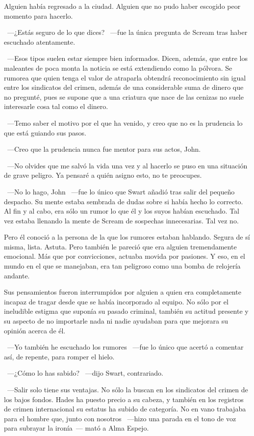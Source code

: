 Alguien había regresado a la ciudad. Alguien que no pudo haber escogido peor momento para hacerlo.

~---¿Estás seguro de lo que dices? ~---fue la única pregunta de Scream tras haber escuchado atentamente.

~---Esos tipos suelen estar siempre bien informados. Dicen, además, que entre los maleantes de poca monta la noticia se está extendiendo como la pólvora. Se rumorea que quien tenga el valor de atraparla obtendrá reconocimiento sin igual entre los sindicatos del crimen, además de una considerable suma de dinero que no pregunté, pues se supone que a una criatura que nace de las cenizas no suele interesarle cosa tal como el dinero.

~---Temo saber el motivo por el que ha venido, y creo que no es la prudencia lo que está guiando sus pasos.

~---Creo que la prudencia nunca fue mentor para sus actos, John.

~---No olvides que me salvó la vida una vez y al hacerlo se puso en una situación de grave peligro. Ya pensaré a quién asigno esto, no te preocupes.

~---No lo hago, John ~---fue lo único que Swart añadió tras salir del pequeño despacho. Su mente estaba sembrada de dudas sobre si había hecho lo correcto. Al fin y al cabo, era sólo un rumor lo que él y los suyos habían escuchado. Tal vez estaba llenando la mente de Scream de sospechas innecesarias. Tal vez no.

Pero él conoció a la persona de la que los rumores estaban hablando. Segura de sí misma, lista. Astuta. Pero también le pareció que era alguien tremendamente emocional. Más que por convicciones, actuaba movida por pasiones. Y eso, en el mundo en el que se manejaban, era tan peligroso como una bomba de relojería andante.

Sus pensamientos fueron interrumpidos por alguien a quien era completamente incapaz de tragar desde que se había incorporado al equipo. No sólo por el ineludible estigma que suponía su pasado criminal, también su actitud presente y su aspecto de no importarle nada ni nadie ayudaban para que mejorara su opinión acerca de él.

~---Yo también he escuchado los rumores ~---fue lo único que acertó a comentar así, de repente, para romper el hielo.

~---¿Cómo lo has sabido? ~---dijo Swart, contrariado.

~---Salir solo tiene sus ventajas. No sólo la buscan en los sindicatos del crimen de los bajos fondos. Hades ha puesto precio a su cabeza, y también en los registros de crimen internacional su estatus ha subido de categoría. No en vano trabajaba para el hombre que, junto con nosotros ~---hizo una parada en el tono de voz para subrayar la ironía~--- mató a Alma Espejo.

